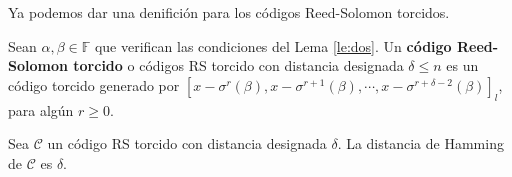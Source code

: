 Ya podemos dar una denifición para los códigos Reed-Solomon torcidos.

\begin{definition}
\label{def:RS}
    Sean $\alpha, \beta \in \mathbb{F}$ que verifican las condiciones del Lema \ref{le:dos}. Un \textbf{código Reed-Solomon torcido} o códigos RS torcido con distancia designada $\delta \leq n$ es un código torcido generado por $[x-\sigma^r(\beta), x-\sigma^{r+1}(\beta),\cdots,x-\sigma^{r+\delta-2}(\beta)]_l $, para algún $r \geq 0$.
\end{definition}

\begin{theorem}
\label{th:RS-torcido}
    Sea $\mathcal{C}$ un código RS torcido con distancia designada $\delta$. La distancia de Hamming de $\mathcal{C}$ es $\delta$.
\end{theorem}

